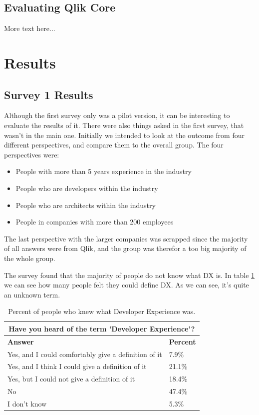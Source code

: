 \documentclass{article}
\begin{document}
\subsection{Evaluating Qlik Core}

More text here...

\section{Results}

\subsection{Survey 1 Results}
Although the first survey only was a pilot version, it can be interesting to evaluate the results of it. There were also things asked in the first survey, that wasn't in the main one.
Initially we intended to look at the outcome from four different perspectives, and compare them to the overall group. The four perspectives were:
\begin{itemize}[label={}]
\item People with more than 5 years experience in the industry
\item People who are developers within the industry
\item People who are architects within the industry
\item People in companies with more than 200 employees
\end{itemize}
The last perspective with the larger companies was
scrapped since the majority of all answers were from Qlik, and the group
was therefor a too big majority of the whole group.

The survey found that the majority of people do not know what DX is. In table \ref{tab:knowdx} we can see how many people felt they could define DX. As we can see, it's quite an unknown term.

\begin{table}[H]
\centering
\begin{tabularx}{\columnwidth}{X|l}
\multicolumn{2}{c}{\textbf{Have you heard of the term 'Developer Experience'?}} \\ \hline \hline
\textbf{Answer} & \textbf{Percent} \\ \hline
Yes, and I could comfortably give a definition of it & 7.9\%  \\ \hline
Yes, and I think I could give a definition of it & 	21.1\%  \\ \hline
Yes, but I could not give a definition of it &	18.4\%  \\ \hline
No &	47.4\%  \\ \hline
I don't know & 5.3\% \\ \hline
\end{tabularx}
\caption{Percent of people who knew what Developer Experience was.}
\label{tab:knowdx}
\end{table}
\end{document}
